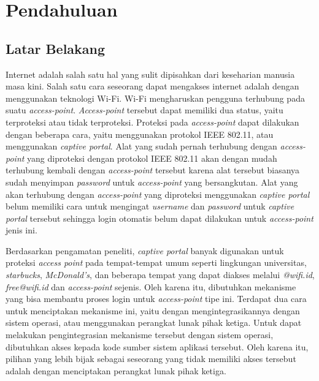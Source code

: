 \chapter{Pendahuluan}
\label{chap:pendahuluan}



\section{Latar Belakang}
\label{sec:latar_belakang}

Internet adalah salah satu hal yang sulit dipisahkan dari keseharian manusia masa kini. Salah satu cara seseorang dapat mengakses internet adalah dengan menggunakan teknologi Wi-Fi. Wi-Fi mengharuskan pengguna terhubung pada suatu \textit{access-point}. \textit{Access-point} tersebut dapat memiliki dua status, yaitu terproteksi atau tidak terproteksi. Proteksi pada \textit{access-point} dapat dilakukan dengan beberapa cara, yaitu menggunakan protokol IEEE 802.11, atau menggunakan \textit{captive portal}. Alat yang sudah pernah terhubung dengan \textit{access-point} yang diproteksi dengan protokol IEEE 802.11 akan dengan mudah terhubung kembali dengan \textit{access-point} tersebut karena alat tersebut biasanya sudah menyimpan \textit{password} untuk \textit{access-point} yang bersangkutan. Alat yang akan terhubung dengan \textit{access-point} yang diproteksi menggunakan \textit{captive portal} belum memiliki cara untuk mengingat \textit{username} dan \textit{password} untuk \textit{captive portal} tersebut sehingga login otomatis belum dapat dilakukan untuk \textit{access-point} jenis ini.

Berdasarkan pengamatan peneliti, \textit{captive portal} banyak digunakan untuk proteksi \textit{access point} pada tempat-tempat umum seperti lingkungan universitas, \textit{starbucks}, \textit{McDonald's}, dan beberapa tempat yang dapat diakses melalui \textit{@wifi.id}, \textit{free@wifi.id} dan \textit{access-point} sejenis. Oleh karena itu, dibutuhkan mekanisme yang bisa membantu proses login untuk \textit{access-point} tipe ini. Terdapat dua cara untuk menciptakan mekanisme ini, yaitu dengan mengintegrasikannya dengan sistem operasi, atau menggunakan perangkat lunak pihak ketiga. Untuk dapat melakukan pengintegrasian mekanisme tersebut dengan sistem operasi, dibutuhkan akses kepada kode sumber sistem aplikasi tersebut. Oleh karena itu, pilihan yang lebih bijak sebagai seseorang yang tidak memiliki akses tersebut adalah dengan menciptakan perangkat lunak pihak ketiga.



